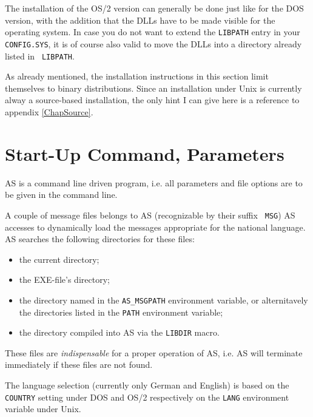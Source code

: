 \documentclass[12pt,twoside]{report}
\begin{document}
The installation of the OS/2 version  can generally
be done just like for the DOS version, with the addition that the DLLs
have to be made visible for the operating system. In case you do not want
to extend the {\tt LIBPATH} entry in your {\tt CONFIG.SYS}, it is of
course also valid to move the DLLs into a directory already listed in {\tt
LIBPATH}.

As already mentioned, the installation instructions in this section limit
themselves to binary distributions.  Since an installation under Unix
 is currently alway a source-based installation, the
only hint I can give here is a reference to appendix \ref{ChapSource}.


\section{Start-Up Command, Parameters}
\label{SectCallConvention}

AS is a command line driven program, i.e. all parameters and file
options are to be given in the command line.

A couple of message files belongs to AS (recognizable by their suffix {\tt
MSG}) AS accesses to dynamically load the messages appropriate for the
national language.  AS searches the following directories for these files:
\begin{itemize}
\item{the current directory;}
\item{the EXE-file's directory;}
\item{the directory named in the {\tt AS\_MSGPATH} environment variable,
      or alternitavely the directories listed in the {\tt PATH} environment
      variable;}
\item{the directory compiled into AS via the {\tt LIBDIR} macro.}
\end{itemize}
These files are {\em indispensable} for a proper operation of AS, i.e. AS
will terminate immediately if these files are not found.

The language selection (currently only German and English) is based on the
{\tt COUNTRY} setting under DOS and OS/2 respectively on the {\tt LANG}
environment variable under Unix.
\end{document}
